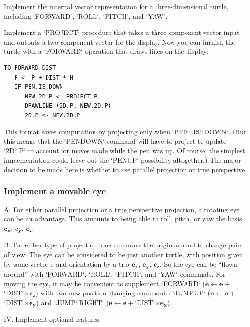 \documentclass{book}
\begin{document}
Implement the internal vector representation for a three-dimensional
turtle, including \textsc{`FORWARD`}, \textsc{`ROLL`}, \textsc{`PITCH`}, and \textsc{`YAW`}.

Implement a \textsc{`PROJECT`} procedure that takes a three-component vector
input and outputs a two-component vector for the display. Now you
can furnish the turtle with a \textsc{`FORWARD`} operation that draws lines on the
display:

\begin{verbatim}
TO FORWARD DIST
   P <- P + DIST * H
   IF PEN.IS.DOWN
      NEW.2D.P <- PROJECT P
      DRAWLINE (2D.P, NEW.2D.P) 
      2D.P <- NEW.2D.P
\end{verbatim}
This format saves computation by projecting only when \textsc{`PEN`}\textsc{`.IS`}\textsc{`.DOWN`}.
(But this means that the \textsc{`PENDOWN`} command will have to project to
update \textsc{`2D`}\textsc{`.P`} to account for moves made while the pen was up. Of
course, the simplest implementation could leave out the \textsc{`PENUP`} possibility
altogether.) The major decision to be made here is whether to use
parallel projection or true perspective.

\subsubsection{Implement a movable eye}

A. For either parallel projection or a true perspective projection, a
rotating eye can be an advantage. This amounts to being able to roll,
pitch, or yaw the basis $\mathbf{e_x}$, $\mathbf{e_y}$, $\mathbf{e_z}$.

B. For either type of projection, one can move the origin around to
change point of view. The eye can be considered to be just another
turtle, with position given by some vector e and orientation by a trio $\mathbf{e_x}$,
$\mathbf{e_y}$, $\mathbf{e_z}$. So the eye can be ``flown around'' with \textsc{`FORWARD`}, \textsc{`ROLL`}, \textsc{`PITCH`}, and
\textsc{`YAW`} commands. For moving the eye, it may be convenient to supplement
\textsc{`FORWARD`} ($\mathbf{e} \leftarrow \mathbf{e} +$\textsc{`DIST`}$\times \mathbf{e_z}$) with two new position-changing commands:
\textsc{`JUMPUP`} ($\mathbf{e} \leftarrow \mathbf{e} + $\textsc{`DIST`}$\times \mathbf{e_y}$) and \textsc{`JUMP`}\textsc{`RIGHT`} ($\mathbf{e} \leftarrow \mathbf{e} + $\textsc{`DIST`}$ \times \mathbf{e_x}$).

IV. Implement optional features.
\end{document}
